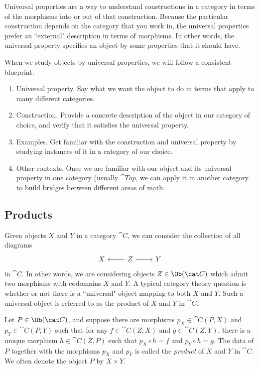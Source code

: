 \documentclass[noname]{notes}
\begin{document}
Universal properties are a way to understand constructions in a category in terms of the morphisms into or out of that construction. Because the particular construction depends on the category that you work in, the universal properties prefer an ``external" description in terms of morphisms. In other words, the universal property specifies an object by some properties that it should have.   

When we study objects by universal properties, we will follow a consistent blueprint: 
\begin{enumerate}[(1)]
	\item Universal property. Say what we want the object to do in terms that apply to many different categories. 
	\item Construction. Provide a concrete description of the object in our category of choice, and verify that it satisfies the universal property. 
	\item Examples. Get familiar with the construction and universal property by studying instances of it in a category of our choice.
	\item Other contexts. Once we are familiar with our object and its universal property in one category (usually $\cat{Top}$, we can apply it in another category to build bridges between different areas of math. 
\end{enumerate}

\subsection{Products}

Given objects $X$ and $Y$ in a category $\cat C$, we can consider the collection of all diagrams 
\[
	\begin{tikzcd}
		X & Z \ar[l] \ar[r] & Y 
	\end{tikzcd}
\]
in $\cat C$. In other words, we are considering objects $Z \in \Ob(\cat C)$ which admit two morphisms with codomains $X$ and $Y$. A typical category theory question is whether or not there is a ``universal" object mapping to both $X$ and $Y$. Such a universal object is referred to as the product of $X$ and $Y$ in $\cat C$. 

\begin{definition}
	Let $P \in \Ob(\cat C)$, and suppose there are morphisms $p_X \in \cat C(P,X)$ and $p_Y \in \cat C(P,Y)$ such that for any $f \in \cat C(Z,X)$ and $g \in \cat C(Z,Y)$, there is a unique morphism $h \in \cat C(Z,P)$ such that $p_X \circ h = f$ and $p_Y \circ h = g$. The data of $P$ together with the morphisms $p_X$ and $p_Y$ is called the \emph{product} of $X$ and $Y$ in $\cat C$. We often denote the object $P$ by $X \times Y$. 
\end{definition}
\end{document}
